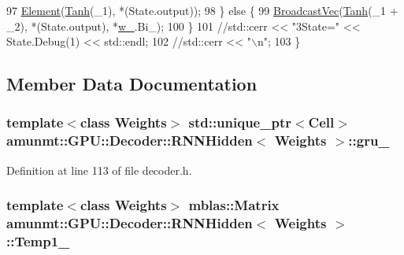 \begin{DoxyCode}
97             \hyperlink{namespaceamunmt_1_1GPU_1_1mblas_adc0a1bee5e001b28e10bff88e940b284}{Element}(\hyperlink{namespacethrust_1_1detail_1_1functional_a565a36ed831a74fec50b00c921f669ba}{Tanh}(\_1), *(State.output));
98           \} \textcolor{keywordflow}{else} \{
99             \hyperlink{namespaceamunmt_1_1GPU_1_1mblas_ace73de50c8241f219ad490d64513829f}{BroadcastVec}(\hyperlink{namespacethrust_1_1detail_1_1functional_a565a36ed831a74fec50b00c921f669ba}{Tanh}(\_1 + \_2), *(State.output), *\hyperlink{classamunmt_1_1GPU_1_1Decoder_1_1RNNHidden_a96f70b0f258c493213bccb861f0014d0}{w\_}.Bi\_);
100           \}
101           \textcolor{comment}{//std::cerr << "3State=" << State.Debug(1) << std::endl;}
102           \textcolor{comment}{//std::cerr << "\(\backslash\)n";}
103         \}
\end{DoxyCode}


\subsection{Member Data Documentation}
\subsubsection[{\texorpdfstring{gru\+\_\+}{gru_}}]{\setlength{\rightskip}{0pt plus 5cm}template$<$class Weights$>$ std\+::unique\+\_\+ptr$<${\bf Cell}$>$ {\bf amunmt\+::\+G\+P\+U\+::\+Decoder\+::\+R\+N\+N\+Hidden}$<$ {\bf Weights} $>$\+::gru\+\_\+\hspace{0.3cm}{\ttfamily [private]}}\hypertarget{classamunmt_1_1GPU_1_1Decoder_1_1RNNHidden_adb4c82513eebad0bf15fc30e80a773c5}{}\label{classamunmt_1_1GPU_1_1Decoder_1_1RNNHidden_adb4c82513eebad0bf15fc30e80a773c5}


Definition at line 113 of file decoder.\+h.

\subsubsection[{\texorpdfstring{Temp1\+\_\+}{Temp1_}}]{\setlength{\rightskip}{0pt plus 5cm}template$<$class Weights$>$ {\bf mblas\+::\+Matrix} {\bf amunmt\+::\+G\+P\+U\+::\+Decoder\+::\+R\+N\+N\+Hidden}$<$ {\bf Weights} $>$\+::Temp1\+\_\+\hspace{0.3cm}{\ttfamily [private]}}\hypertarget{classamunmt_1_1GPU_1_1Decoder_1_1RNNHidden_a1a68b1758b067423c6727404933caa4f}{}\label{classamunmt_1_1GPU_1_1Decoder_1_1RNNHidden_a1a68b1758b067423c6727404933caa4f}


